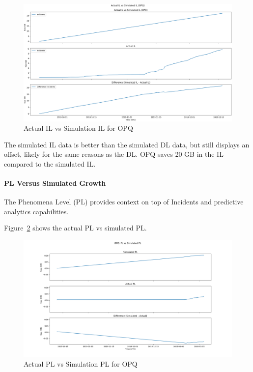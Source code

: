 \begin{figure}[H]
    \centering
    \includegraphics[width=\linewidth]{figures/actual_il_vs_sim_opq.png}
    \caption{Actual IL vs Simulation IL for OPQ}
    \label{fig:actual_il_vs_sim_opq}
\end{figure}

The simulated IL data is better than the simulated DL data, but still displays an offset, likely for the same reasons as the DL. OPQ saves 20 GB in the IL compared to the simulated IL.

\paragraph{PL Versus Simulated Growth}
The Phenomena Level (PL) provides context on top of Incidents and predictive analytics capabilities.

Figure~\ref{fig:actual_phenomena_opq_vs_sim} shows the actual PL vs simulated PL.

\begin{figure}[H]
    \centering
    \includegraphics[width=\linewidth]{figures/actual_phenomena_opq_vs_sim.png}
    \caption{Actual PL vs Simulation PL for OPQ}
    \label{fig:actual_phenomena_opq_vs_sim}
\end{figure}

